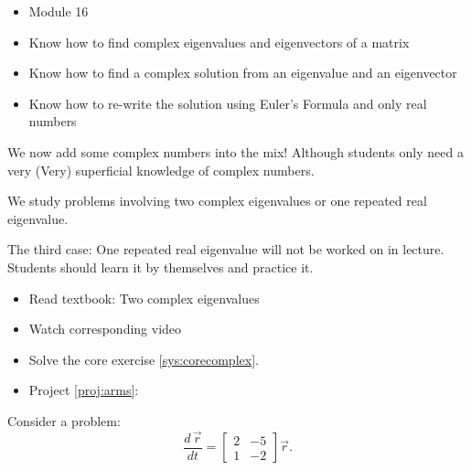 \bookonlynewpage
\begin{lesson}

	\begin{itemize}
		\item Module 16
	\end{itemize}

	\begin{itemize}
		\item Know how to find complex eigenvalues and eigenvectors of a matrix
		\item Know how to find a complex solution from an eigenvalue and an eigenvector
		\item Know how to re-write the solution using Euler's Formula and only real numbers
	\end{itemize}
	

We now add some complex numbers into the mix! Although students only need a very (Very) superficial knowledge of complex numbers. 

We study problems involving two complex eigenvalues or one repeated real eigenvalue. 

The third case: One repeated real eigenvalue will not be worked on in lecture. Students should learn it by themselves and practice it.

\begin{itemize}
	\item Read textbook: Two complex eigenvalues
	\item Watch corresponding video
	\item Solve the core exercise \ref{sys:corecomplex}.
\end{itemize}

\begin{itemize}
	\item Project \ref{proj:arms}: \armstitle
\end{itemize}


\end{lesson}




\begin{annotation}
\begin{goals}
\end{goals}
\end{annotation}
\question \label{sys:corecomplex}
Consider a problem:
$$
\frac{d \,\vec{r}}{dt} = \begin{bmatrix} 2 & -5 \\ 1 & -2\end{bmatrix} \vec{r}.
$$
	

